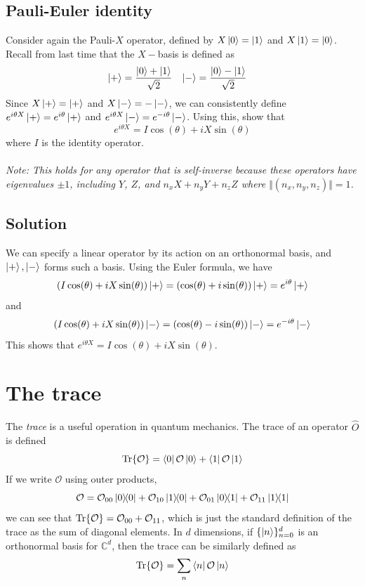 \documentclass{article}
\begin{document}
{\subsection*{Pauli-Euler identity}
Consider again the Pauli-$X$ operator, defined by $X \ket{0} = \ket{1}$ and $X \ket{1} = \ket{0}$. Recall from last time that the $X-$basis is defined as
\begin{align}
\ket{+} &= \frac{\ket 0 + \ket 1}{\sqrt{2}} &
\ket{-} &= \frac{\ket 0 - \ket 1}{\sqrt{2}}
\end{align}
Since $X\ket{+} = \ket{+}$ and $X \ket{-} = -\ket{-}$, we can consistently define $e^{i\theta X}\ket{+} = e^{i\theta}\ket{+}$ and $e^{i\theta X}\ket{-} = e^{-i\theta}\ket{-}$. Using this, show that
$$
e^{i\theta X} = I\cos(\theta) + i X\sin(\theta)
$$
where $I$ is the identity operator.\\ \\
\noindent \textit{Note: This holds for any operator that is self-inverse because these operators have eigenvalues $\pm 1$, including $Y$, $Z$, and $n_xX + n_yY + n_zZ$ where $\Vert (n_x, n_y, n_z) \Vert = 1$.}

\subsection*{Solution}
We can specify a linear operator by its action on an orthonormal basis, and $\ket{+}, \ket{-}$ forms such a basis. Using the Euler formula, we have
$$
(I\cos(\theta) + iX\sin(\theta))\ket{+} = (\cos(\theta) + i\sin(\theta))\ket{+} = e^{i\theta}\ket{+}
$$
and
$$
(I\cos(\theta) + iX\sin(\theta))\ket{-} = (\cos(\theta) - i\sin(\theta))\ket{-} = e^{-i\theta}\ket{-}
$$
This shows that $e^{i\theta X} = I\cos(\theta) + iX\sin(\theta)$.

\section*{The trace}
The \textit{trace} is a useful operation in quantum mechanics. The trace of an operator $\hat{ O}$ is defined
$$
\Tr{\mathcal O} = \bra{0}\mathcal O \ket{0} + \bra{1} \mathcal O \ket{1}
$$
If we write $\mathcal O$ using outer products,
$$
\mathcal O = \mathcal O_{00}\ketbra{0}{0} + \mathcal O_{10}\ketbra{1}{0} + \mathcal O_{01}\ketbra{0}{1} + \mathcal O_{11}\ketbra{1}{1}
$$
we can see that $\Tr{\mathcal O} = \mathcal O_{00} + \mathcal O_{11}$, which is just the standard definition of the trace as the sum of diagonal elements. In $d$ dimensions, if $\{\ket{n}\}_{n=0}^d$ is an orthonormal basis for $\mathbb C^d$, then the trace can be similarly defined as
$$
\Tr{\mathcal O} = \sum_{n}\bra{n}\mathcal O \ket{n}
$$

}
\end{document}
